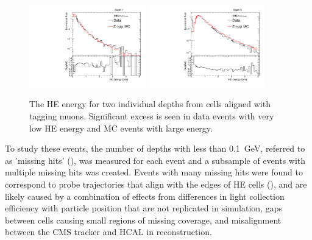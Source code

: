 \begin{figure}[htbp]
	\centering
	\includegraphics[width=0.45\textwidth]{figures/hcalAllE_depth0.pdf}
        \hspace{0.01\textwidth}
        \includegraphics[width=0.45\textwidth]{figures/hcalAllE_depth4.pdf}
        \caption[HE Energy Deposits Along Tag-Aligned Muons]{The HE energy for two individual depths from cells aligned with tagging muons. Significant excess is seen in data events with very low HE energy and MC events with large energy.}
        \label{fig:unCorrHEDepths}
\end{figure}

To study these events, the number of depths with less than \SI{0.1}{\giga\eV}, referred to as 'missing hits' (), was measured for each event and a subsample of events with multiple missing hits was created. 
Events with many missing hits were found to correspond to probe trajectories that align with the edges of HE cells (), and are likely caused by a combination of effects from differences in light collection efficiency with particle position that are not replicated in simulation, gaps between cells causing small regions of missing coverage, and misalignment between the CMS tracker and HCAL in reconstruction.

